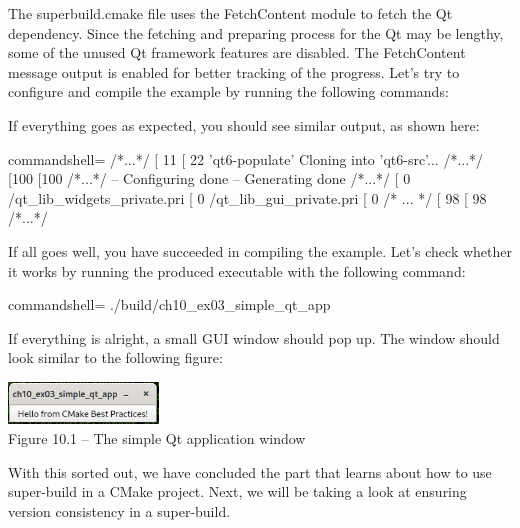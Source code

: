 The superbuild.cmake file uses the FetchContent module to fetch the Qt dependency. Since the fetching and preparing process for the Qt may be lengthy, some of the unused Qt framework features are disabled. The FetchContent message output is enabled for better tracking of the progress. Let's try to configure and compile the example by running the following commands:


If everything goes as expected, you should see similar output, as shown here:

\begin{tcblisting}{commandshell={}}
/*...*/
[ 11%
[ 22%
  'qt6-populate'
Cloning into 'qt6-src'...
/*...*/
[100%
[100%
/*...*/
-- Configuring done
-- Generating done
/*...*/
[ 0%
  /qt_lib_widgets_private.pri
[ 0%
/qt_lib_gui_private.pri
[ 0%
/* ... */
[ 98%
[ 98%
/*...*/
\end{tcblisting}

If all goes well, you have succeeded in compiling the example. Let's check whether it works by running the produced executable with the following command:

\begin{tcblisting}{commandshell={}}
./build/ch10_ex03_simple_qt_app
\end{tcblisting}

If everything is alright, a small GUI window should pop up. The window should look similar to the following figure:

\begin{center}
\includegraphics[width=0.3\textwidth]{content/2/chapter10/images/1.jpg}\\
Figure 10.1 – The simple Qt application window
\end{center}

With this sorted out, we have concluded the part that learns about how to use super-build in a CMake project. Next, we will be taking a look at ensuring version consistency in a super-build.

















